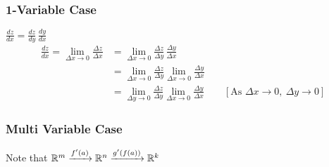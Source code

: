 \begin{myproof}
	\subsubsection{1-Variable Case}
	$\frac{dz}{dx}=\frac{dz}{dy}\, \frac{dy}{dx}$\begin{align*}
		\frac{dz}{dx} =\lim_{\Delta x\to 0} \frac{\Delta z}{\Delta x} & =\lim_{\Delta x\to 0}\frac{\Delta z}{\Delta y}\, \frac{\Delta y}{\Delta x}                                                                  \\
		                                                              & =\lim_{\Delta x\to 0}\frac{\Delta z}{\Delta y}\lim_{\Delta x\to 0} \frac{\Delta y}{\Delta x}                                                \\
		                                                              & =\lim_{\Delta y\to 0}\frac{\Delta z}{\Delta y}\lim_{\Delta x\to 0} \frac{\Delta y}{\Delta x}\qquad [\text{As }\Delta x\to0,\ \Delta y\to 0]
	\end{align*}
	\subsubsection{Multi Variable Case}
	Note that $\mathbb{R}^m\xrightarrow{f'(a)}\mathbb{R}^n\xrightarrow{g'(f(a))}\mathbb{R}^k$


\end{myproof}
